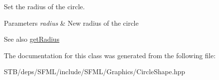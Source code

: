 Set the radius of the circle. 


\begin{DoxyParams}{Parameters}
{\em radius} & New radius of the circle\\
\hline
\end{DoxyParams}
\begin{DoxySeeAlso}{See also}
\hyperlink{classsf_1_1_circle_shape_afaf5175a75b6179cc177b1281027ab00}{get\+Radius} 
\end{DoxySeeAlso}


The documentation for this class was generated from the following file\+:\begin{DoxyCompactItemize}
\item 
S\+T\+B/deps/\+S\+F\+M\+L/include/\+S\+F\+M\+L/\+Graphics/Circle\+Shape.\+hpp\end{DoxyCompactItemize}
